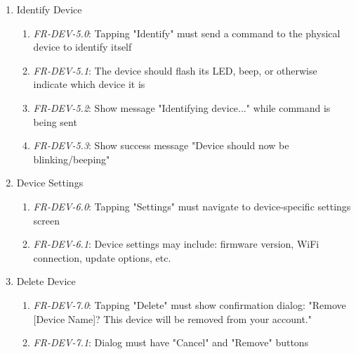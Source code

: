 \documentclass[conference]{IEEEtran}
\begin{document}
\begin{enumerate}
\begin{enumerate}
                            \item \textit{FR-DEV-4.1}: The dialog must display current device name as default value
                            \item \textit{FR-DEV-4.2}: Include "Cancel" and "Save" buttons
                            \item \textit{FR-DEV-4.3}: Device name must be 1-50 characters
                            \item \textit{FR-DEV-4.4}: Show success message "Device renamed" after save
                        \end{enumerate}
                    \item Identify Device
                        \begin{enumerate}
                            \item \textit{FR-DEV-5.0}: Tapping "Identify" must send a command to the physical device to identify itself
                            \item \textit{FR-DEV-5.1}: The device should flash its LED, beep, or otherwise indicate which device it is
                            \item \textit{FR-DEV-5.2}: Show message "Identifying device..." while command is being sent
                            \item \textit{FR-DEV-5.3}: Show success message "Device should now be blinking/beeping"
                        \end{enumerate}
                    \item Device Settings
                        \begin{enumerate}
                            \item \textit{FR-DEV-6.0}: Tapping "Settings" must navigate to device-specific settings screen
                            \item \textit{FR-DEV-6.1}: Device settings may include: firmware version, WiFi connection, update options, etc.
                        \end{enumerate}
                    \item Delete Device
                        \begin{enumerate}
                            \item \textit{FR-DEV-7.0}: Tapping "Delete" must show confirmation dialog: "Remove [Device Name]? This device will be removed from your account."
                            \item \textit{FR-DEV-7.1}: Dialog must have "Cancel" and "Remove" buttons

\end{enumerate}
\end{enumerate}
\end{document}
